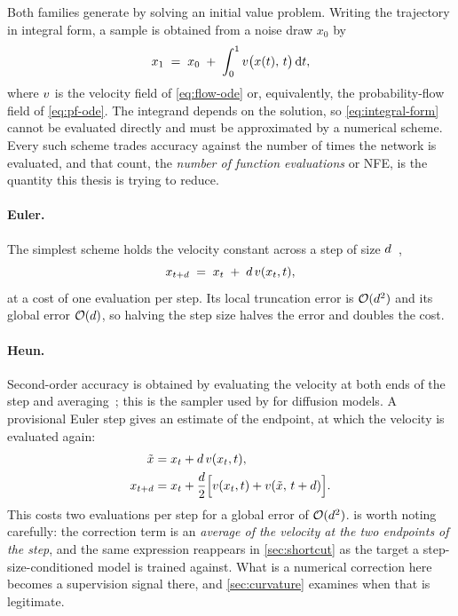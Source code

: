 Both families generate by solving an initial value problem. Writing the
trajectory in integral form, a sample is obtained from a noise draw $x_0$ by
\begin{equation}
  \label{eq:integral-form}
  x_1 \;=\; x_0 \;+\; \int_{0}^{1} v\big(x(t),\, t\big)\,\mathrm{d}t ,
\end{equation}
where $v$ is the velocity field of \cref{eq:flow-ode} or, equivalently,
the probability-flow field of \cref{eq:pf-ode}. The integrand depends on the
solution, so \cref{eq:integral-form} cannot be evaluated directly and must
be approximated by a numerical scheme. Every such scheme trades accuracy
against the number of times the network is evaluated, and that count, the
\emph{number of function evaluations} or NFE, is the quantity this thesis
is trying to reduce.

\paragraph{Euler.} The simplest scheme holds the velocity constant across a
step of size $d$~\citep{hairer1993ode},
\begin{equation}
  \label{eq:euler}
  x_{t+d} \;=\; x_t \;+\; d\,v(x_t, t),
\end{equation}
at a cost of one evaluation per step. Its local truncation error is
$\mathcal{O}(d^2)$ and its global error $\mathcal{O}(d)$, so
halving the step size halves the error and doubles the cost.

\paragraph{Heun.} Second-order accuracy is obtained by evaluating the
velocity at both ends of the step and averaging~\citep{hairer1993ode}; this
is the sampler used by \citet{karras2022edm} for diffusion models. A provisional Euler step
gives an estimate of the endpoint, at which the velocity is evaluated again:
\begin{align}
  \label{eq:heun}
  \tilde{x} &= x_t + d\,v(x_t, t), \nonumber \\
  x_{t+d} &= x_t + \frac{d}{2}\Big[v(x_t, t) + v(\tilde{x},\, t+d)\Big].
\end{align}
This costs two evaluations per step for a global error of
$\mathcal{O}(d^2)$.  is worth noting carefully: the
correction term is an \emph{average of the velocity at the two endpoints of
the step}, and the same expression reappears in \cref{sec:shortcut} as the
target a step-size-conditioned model is trained against. What is a numerical
correction here becomes a supervision signal there, and
\cref{sec:curvature} examines when that is legitimate.

